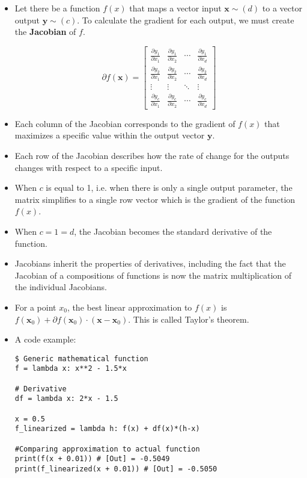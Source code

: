 \documentclass{article}
\newcommand{\mbf}[1]{\mathbf{#1}}
\begin{document}
\begin{itemize}
    \item Let there be a function $f(x)$ that maps a vector input $\mbf{x} \sim (d)$ to a vector output $\mbf{y} \sim (c)$. To calculate the gradient for each output, we must create the \textbf{Jacobian} of $f$.
        
        \[\partial f(\mathbf{x}) = 
        \begin{bmatrix}
        \frac{\partial y_1}{\partial x_1} & \frac{\partial y_1}{\partial x_2} & \cdots & \frac{\partial y_1}{\partial x_d} \\
        \frac{\partial y_2}{\partial x_1} & \frac{\partial y_2}{\partial x_2} & \cdots & \frac{\partial y_2}{\partial x_d} \\
        \vdots & \vdots & \ddots & \vdots \\
        \frac{\partial y_c}{\partial x_1} & \frac{\partial y_c}{\partial x_2} & \cdots & \frac{\partial y_c}{\partial x_d}
        \end{bmatrix}
        \]
    \item Each column of the Jacobian corresponds to the gradient of $f(x)$ that maximizes a specific value within the output vector $\mbf{y}$.
    \item Each row of the Jacobian describes how the rate of change for the outputs changes with respect to a specific input.
    \item When $c$ is equal to 1, i.e. when there is only a single output parameter, the matrix simplifies to a single row vector which is the gradient of the function $f(x)$.
    \item When $c = 1 = d$, the Jacobian becomes the standard derivative of the function. 
    \item Jacobians inherit the properties of derivatives, including the fact that the Jacobian of a compositions of functions is now the matrix multiplication of the individual Jacobians. 
    \item For a point $x_0$, the best linear approximation to $f(x)$ is $f(\mbf{x}_0) + \partial f(\mbf{x}_0) \cdot (\mbf{x} - \mbf{x}_0)$. This is called Taylor's theorem.
    \item A code example:
\begin{lstlisting}
$ Generic mathematical function
f = lambda x: x**2 - 1.5*x

# Derivative 
df = lambda x: 2*x - 1.5

x = 0.5
f_linearized = lambda h: f(x) + df(x)*(h-x)

#Comparing approximation to actual function
print(f(x + 0.01)) # [Out] = -0.5049
print(f_linearized(x + 0.01)) # [Out] = -0.5050
\end{lstlisting}
\end{itemize}
\end{document}
